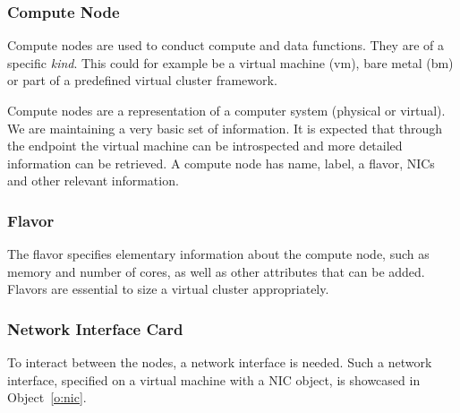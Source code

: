 \documentclass[10pt]{article}
\begin{document}


\subsubsection{Compute Node}

Compute nodes are used to conduct compute and data functions. They are
of a specific {\it kind}. This could for example be a virtual machine
(vm), bare metal (bm) or part of a predefined virtual cluster
framework. 

Compute nodes are a representation of a computer system (physical or
virtual). We are maintaining a very basic set of information. It is
expected that through the endpoint the virtual machine can be
introspected and more detailed information can be retrieved. A compute
node has name, label, a flavor, NICs and other relevant information.



\subsubsection{Flavor}

The flavor specifies elementary information about the compute node,
such as memory and number of cores, as well as other attributes that can
be added. Flavors are essential to size a virtual cluster appropriately.



%
%
%
%

\subsubsection{Network Interface Card}

To interact between the nodes, a network interface is needed. Such a
network interface, specified on a virtual machine with a NIC
object, is showcased in Object~\ref{o:nic}. 

\end{document}
